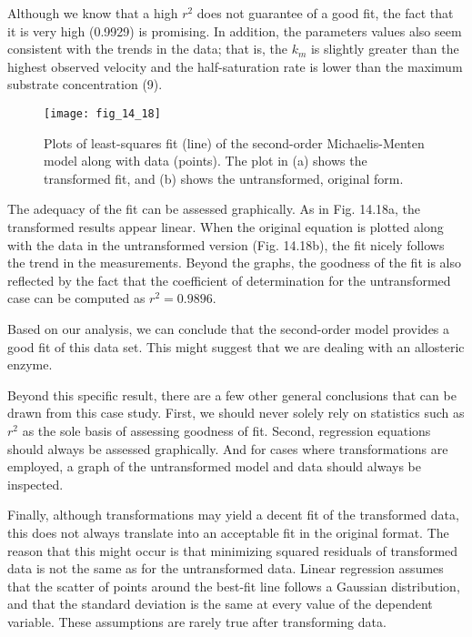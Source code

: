 \documentclass[../main.tex]{subfiles}
\begin{document}
Although we know that a high $r^2$ does not guarantee of a good fit, the fact that it is very high (0.9929) is promising. In addition, the parameters values also seem consistent with the trends in the data; that is, the $k_m$ is slightly greater than the highest observed velocity and the half-saturation rate is lower than the maximum substrate concentration (9).

\begin{figure}[H] 
	\centering
	\texttt{[image: fig\_14\_18]}
	\caption{\textsf{Plots of least-squares fit (line) of the second-order Michaelis-Menten model along with data (points). The plot in (a) shows the transformed fit, and (b) shows the untransformed, original form.}}
	\label{fig:fig_14_18}
\end{figure}

The adequacy of the fit can be assessed graphically. As in Fig. 14.18a, the transformed results appear linear. When the original equation is plotted along with the data in the untransformed version (Fig. 14.18b), the fit nicely follows the trend in the measurements. Beyond the graphs, the goodness of the fit is also reflected by the fact that the coefficient of determination for the untransformed case can be computed as $r^2 = 0.9896$.

Based on our analysis, we can conclude that the second-order model provides a good fit of this data set. This might suggest that we are dealing with an allosteric enzyme. 

Beyond this specific result, there are a few other general conclusions that can be drawn from this case study. First, we should never solely rely on statistics such as $r^2$ as the sole basis of assessing goodness of fit. Second, regression equations should always be assessed graphically. And for cases where transformations are employed, a graph of the untransformed model and data should always be inspected. 

Finally, although transformations may yield a decent fit of the transformed data, this does not always translate into an acceptable fit in the original format. The reason that this might occur is that minimizing squared residuals of transformed data is not the same as for the untransformed data. Linear regression assumes that the scatter of points around the best-fit line follows a Gaussian distribution,  and that the standard deviation is the same at every value of the dependent variable. These assumptions are rarely true after transforming data. 
\end{document}
